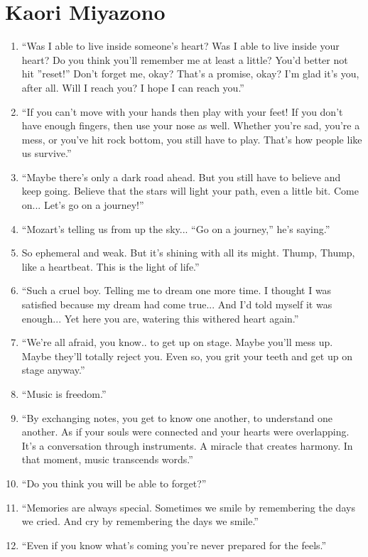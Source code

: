 \documentclass{book}
\numberwithin{equation}{section}
\begin{document}
\section{Kaori Miyazono}
\begin{enumerate}
    \item ``Was I able to live inside someone's heart? Was I able to live inside your heart? Do you think you'll remember me at least a little? You'd better not hit ''reset!'' Don't forget me, okay? That's a promise, okay? I'm glad it's you, after all. Will I reach you? I hope I can reach you.''
    \item ``If you can't move with your hands then play with your feet! If you don't have enough fingers, then use your nose as well. Whether you're sad, you're a mess, or you've hit rock bottom, you still have to play. That's how people like us survive.''
    \item ``Maybe there's only a dark road ahead. But you still have to believe and keep going. Believe that the stars will light your path, even a little bit. Come on... Let's go on a journey!''
    \item ``Mozart's telling us from up the sky... ``Go on a journey,'' he's saying.''
    \item So ephemeral and weak. But it's shining with all its might. Thump, Thump, like a heartbeat. This is the light of life.''
    \item ``Such a cruel boy. Telling me to dream one more time. I thought I was satisfied because my dream had come true... And I'd told myself it was enough... Yet here you are, watering this withered heart again.''
    \item ``We're all afraid, you know.. to get up on stage. Maybe you'll mess up. Maybe they'll totally reject you. Even so, you grit your teeth and get up on stage anyway.''
    \item ``Music is freedom.''
    \item ``By exchanging notes, you get to know one another, to understand one another. As if your souls were connected and your hearts were overlapping. It's a conversation through instruments. A miracle that creates harmony. In that moment, music transcends words.''
    \item ``Do you think you will be able to forget?''
    \item ``Memories are always special. Sometimes we smile by remembering the days we cried. And cry by remembering the days we smile.''
    \item ``Even if you know what's coming you're never prepared for the feels.''

\end{enumerate}
\end{document}
